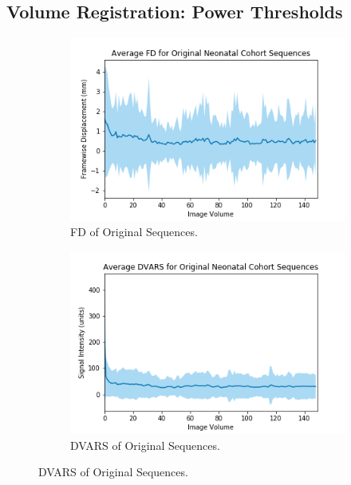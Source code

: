 \subsection{Volume Registration: Power Thresholds}

\begin{figure}[t]
	\centering
	\begin{subfigure}{0.4\textwidth}
		\centering
		\includegraphics[width=1.0\textwidth]{6/figures/neonates-bold-fd-150.png}
		\caption{FD of Original Sequences.}
	\end{subfigure}
	\hspace{0.05\textwidth}
	\begin{subfigure}{0.4\textwidth}
		\centering
		\includegraphics[width=1.0\textwidth]{6/figures/neonates-bold-dvars-150.png}
		\caption{DVARS of Original Sequences.}
	\end{subfigure}
	

\end{figure}
